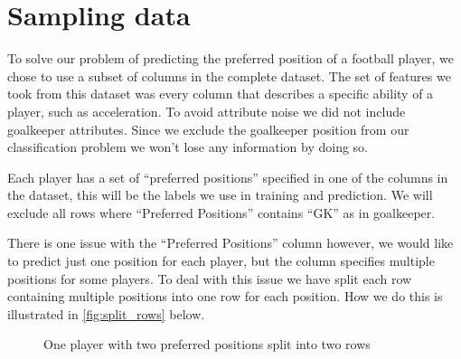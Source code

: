\section{Sampling data}

To solve our problem of predicting the preferred position of a football player, we chose to use a subset of columns in the complete dataset. The set of features we took from this dataset was every column that describes a specific ability of a player, such as acceleration. To avoid attribute noise we did not include goalkeeper attributes. Since we exclude the goalkeeper position from our classification problem we won't lose any information by doing so. 
\par
Each player has a set of ``preferred positions'' specified in one of the columns in the dataset, this will be the labels we use in training and prediction. We will exclude all rows where ``Preferred Positions'' contains ``GK'' as in goalkeeper. 
\par
There is one issue with the ``Preferred Positions'' column however, we would like to predict just one position for each player, but the column specifies multiple positions for some players. To deal with this issue we have split each row containing multiple positions into one row for each position. How we do this is illustrated in \autoref{fig:split_rows} below.
\begin{figure}[!ht]
    \centering
    \caption{One player with two preferred positions split into two rows}\label{fig:split_rows}
\end{figure}